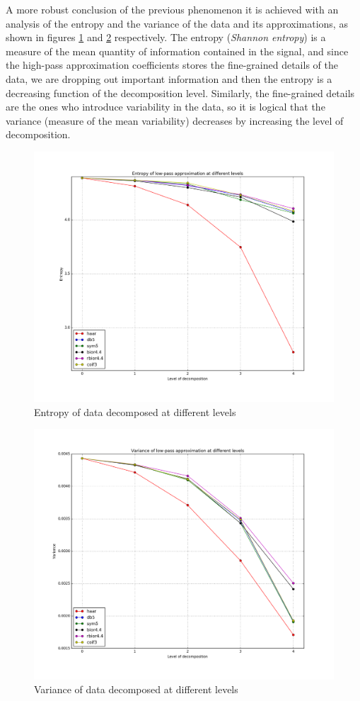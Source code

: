 \documentclass[letter, 11pt]{article}
\begin{document}
\begin{description}
    A more robust conclusion of the previous phenomenon it is achieved with an analysis of the entropy and the variance of the data and its approximations, as shown in figures \ref{fig:entropy} and \ref{fig:variance} respectively. The entropy (\textit{Shannon entropy}) is a measure of the mean quantity of information contained in the signal, and since the high-pass approximation coefficients stores the fine-grained details of the data, we are dropping out important information and then the entropy is a decreasing function of the decomposition level. Similarly, the fine-grained details are the ones who introduce variability in the data, so it is logical that the variance (measure of the mean variability) decreases by increasing the level of decomposition.
    \begin{figure}[htpb!]
    \centering
    \includegraphics[width=12cm]{entropygraph}
    \caption{Entropy of data decomposed at different levels}
    \label{fig:entropy}
    \end{figure}
    \begin{figure}[htpb!]
    \centering
    \includegraphics[width=12cm]{variancegraph}
    \caption{Variance of data decomposed at different levels}
    \label{fig:variance}
    \end{figure}


\end{description}
\end{document}
